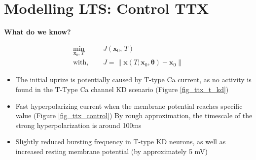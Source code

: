 \documentclass[11pt]{article}
\begin{document}
\section{Modelling LTS: Control TTX}

\textbf{What do we know?}

\begin{align}
    \min_{\mathbf{x}_0,\, T} & \quad J({\mathbf{x}_0,\, T})\\
    \text{with, } & \quad J = \left\| \mathbf{x}(T; \mathbf{x}_0 ,\boldsymbol\theta) - \mathbf{x}_0 \right\|
\end{align}

\begin{itemize}
    \item The initial uprize is potentially caused by T-type Ca current, as no activity
    is found in the T-Type Ca channel KD scenario (Figure \ref{fig_ttx_t_kd})
    
    \item Fast hyperpolarizing current when the membrane potential reaches specific value (Figure \ref{fig_ttx_control})
    By rough approximation, the timescale of the strong hyperpolarization is around 100ms
    
    \item Slightly reduced bursting frequency in T-type KD neurons, as well as increased resting membrane
    potential (by approximately 5 mV)


\end{itemize}
\end{document}
